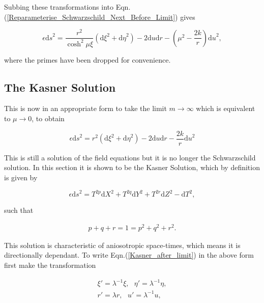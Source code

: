 \noindent Subbing these transformations into Eqn.(\ref{Reparameterise_Schwarzschild_Next_Before_Limit}) gives

\begin{equation*}
\epsilon {\mathrm{d}s}^2 = \frac{r^2}{\cosh^{2}{\mu \xi}} ({\mathrm{d}\xi}^2 + {\mathrm{d}\eta}^2) - 2 {\mathrm{d}u}{\mathrm{d}r} - \left( \mu^{2} - \frac{2k}{r} \right) {\mathrm{d}u}^2,
\end{equation*}

\noindent where the primes have been dropped for convenience. 

\subsection{The Kasner Solution}

This is now in an appropriate form to take the limit $m \rightarrow \infty$ which is equivalent to $\mu \rightarrow 0$, to obtain

\begin{equation}\label{Kasner_after_limit}
\epsilon {\mathrm{d}s}^2 = r^2 ({\mathrm{d}\xi}^2 + {\mathrm{d}\eta}^2) - 2 {\mathrm{d}u}{\mathrm{d}r} - \frac{2k}{r} {\mathrm{d}u}^2
\end{equation}

\noindent This is still a solution of the field equations but it is no longer the Schwarzschild solution. In this section it is shown to be the Kasner Solution, which by definition is given by

\begin{equation}\label{Reparameterise_Definition_Of_Kasner} 
\epsilon {\mathrm{d}s}^2 = T^{2p} {\mathrm{d}X}^2 + T^{2q} \mathrm{d}Y^2 + T^{2r} \mathrm{d}Z^2 - \mathrm{d}T^2,
\end{equation}

\noindent such that

\begin{eqnarray*}
p + q + r = 1 = p^2 + q^2 + r^2.
\end{eqnarray*}

This solution is characteristic of aniosotropic space-times, which means it is directionally dependant. To write Eqn.(\ref{Kasner_after_limit}) in the above form first make the transformation

\begin{gather*} 
\xi' = \lambda^{-1} \xi, \text{    }  \eta' = \lambda^{-1} \eta, \\
r' = \lambda r,          \text{    }  u' = \lambda^{-1} u,
\end{gather*}

